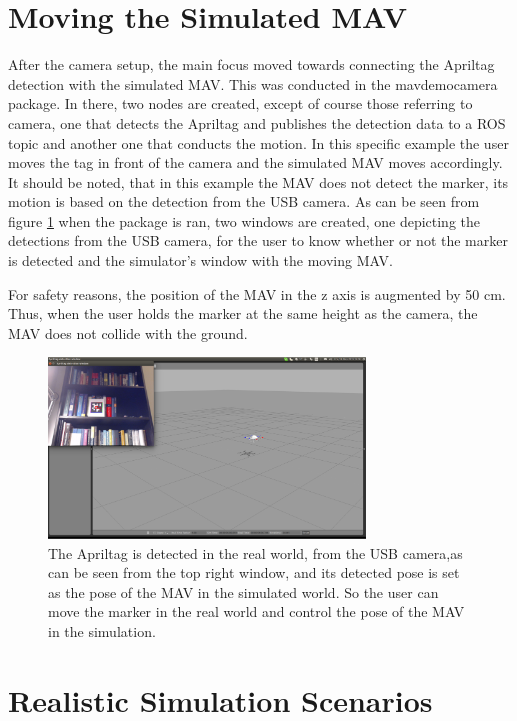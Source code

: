 \section{Moving the Simulated MAV}
\label{sec:movingMAV}
After the camera setup, the main focus moved towards connecting the Apriltag detection with the simulated MAV. This was conducted in the mav\textunderscore demo\textunderscore camera package. In there, two nodes are created, except of course those referring to camera, one that detects the Apriltag and publishes the detection data to a ROS topic and another one that conducts the motion. In this specific example the user moves the tag in front of the camera and the simulated MAV moves accordingly. It should be noted, that in this example the MAV does not detect the marker, its motion is based on the detection from the USB camera. As can be seen from figure \ref{pics:mav_demo_camera} when the package is ran, two windows are created, one depicting the detections from the USB camera, for the user to know whether or not the marker is detected and the simulator's window with the moving MAV.  

For safety reasons, the position of the MAV in the z axis is augmented by 50 cm. Thus, when the user holds the marker at the same height as the camera, the MAV does not collide with the ground.

\begin{figure}
   \centering
   \includegraphics[width=0.75\textwidth]{images/mav_demo_camera.pdf}
   \caption{The Apriltag is detected in the real world, from the USB camera,as can be seen from the top right window, and its detected pose is set as the pose of the MAV in the simulated world. So the user can move the marker in the real world and control the pose of the MAV in the simulation.}
   \label{pics:mav_demo_camera}
\end{figure}


\section{Realistic Simulation Scenarios}
\label{sec: apriltagFireflySimulation}

